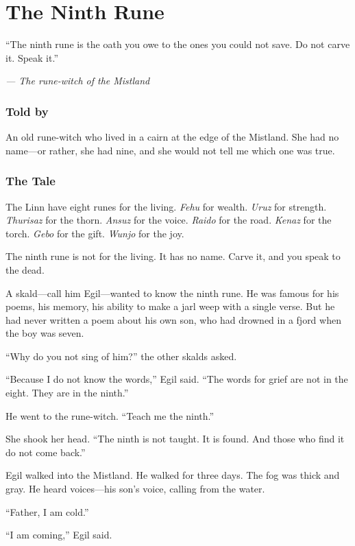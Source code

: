 \documentclass[9pt,a5paper]{extbook}
\begin{document}
\clearpage

\chapter{The Ninth Rune}

\epigraph{``The ninth rune is the oath you owe to the ones you could not save. Do not carve it. Speak it.''}{\textit{--- The rune-witch of the Mistland}}

\subsection*{Told by}

An old rune-witch who lived in a cairn at the edge of the Mistland. She had no name---or rather, she had nine, and she would not tell me which one was true.

\subsection*{The Tale}

The Linn have eight runes for the living. \textit{Fehu} for wealth. \textit{Uruz} for strength. \textit{Thurisaz} for the thorn. \textit{Ansuz} for the voice. \textit{Raido} for the road. \textit{Kenaz} for the torch. \textit{Gebo} for the gift. \textit{Wunjo} for the joy.

The ninth rune is not for the living. It has no name. Carve it, and you speak to the dead.

A skald---call him Egil---wanted to know the ninth rune. He was famous for his poems, his memory, his ability to make a jarl weep with a single verse. But he had never written a poem about his own son, who had drowned in a fjord when the boy was seven.

``Why do you not sing of him?'' the other skalds asked.

``Because I do not know the words,'' Egil said. ``The words for grief are not in the eight. They are in the ninth.''

He went to the rune-witch. ``Teach me the ninth.''

She shook her head. ``The ninth is not taught. It is found. And those who find it do not come back.''

Egil walked into the Mistland. He walked for three days. The fog was thick and gray. He heard voices---his son's voice, calling from the water.

``Father, I am cold.''

``I am coming,'' Egil said.
\end{document}
